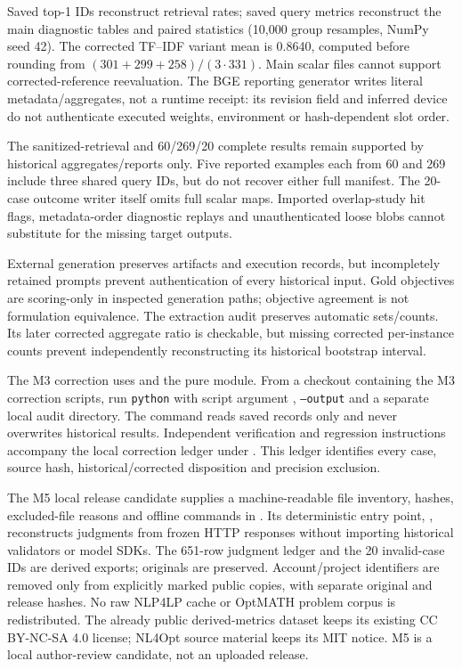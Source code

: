 Saved top-1 IDs reconstruct retrieval rates; saved query metrics reconstruct the main diagnostic tables and paired statistics (10,000 group resamples, NumPy seed 42). The corrected TF--IDF variant mean is 0.8640, computed before rounding from $(301+299+258)/(3\cdot331)$. Main scalar files cannot support corrected-reference reevaluation. The BGE reporting generator writes literal metadata/aggregates, not a runtime receipt: its revision field and inferred device do not authenticate executed weights, environment or hash-dependent slot order.

The sanitized-retrieval and 60/269/20 complete results remain supported by historical aggregates/reports only. Five reported examples each from 60 and 269 include three shared query IDs, but do not recover either full manifest. The 20-case outcome writer itself omits full scalar maps. Imported overlap-study hit flags, metadata-order diagnostic replays and unauthenticated loose blobs cannot substitute for the missing target outputs.

External generation preserves artifacts and execution records, but incompletely retained prompts prevent authentication of every historical input. Gold objectives are scoring-only in inspected generation paths; objective agreement is not formulation equivalence. The extraction audit preserves automatic sets/counts. Its later corrected aggregate ratio is checkable, but missing corrected per-instance counts prevent independently reconstructing its historical bootstrap interval.

The M3 correction uses  and the pure  module. From a checkout containing the M3 correction scripts, run \texttt{python} with script argument , \texttt{--output} and a separate local audit directory. The command reads saved records only and never overwrites historical results. Independent verification and regression instructions accompany the local correction ledger under . This ledger identifies every case, source hash, historical/corrected disposition and precision exclusion.

The M5 local release candidate supplies a machine-readable file inventory, hashes, excluded-file reasons and offline commands in . Its deterministic entry point, , reconstructs judgments from frozen HTTP responses without importing historical validators or model SDKs. The 651-row judgment ledger and the 20 invalid-case IDs are derived exports; originals are preserved. Account/project identifiers are removed only from explicitly marked public copies, with separate original and release hashes. No raw NLP4LP cache or OptMATH problem corpus is redistributed. The already public derived-metrics dataset keeps its existing CC BY-NC-SA 4.0 license; NL4Opt source material keeps its MIT notice. M5 is a local author-review candidate, not an uploaded release.

